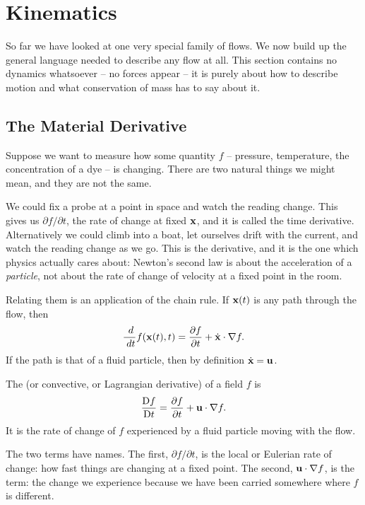 \documentclass[a4paper]{scrartcl}
\newcommand{\D}{\mathrm{D}}
\newcommand{\Dt}[1]{\frac{\D #1}{\D t}}
\newcommand{\pd}[2]{\frac{\partial #1}{\partial #2}}
\begin{document}
\section{Kinematics} \label{sec:kinematics}

So far we have looked at one very special family of flows. We now build up the general language needed to describe any flow at all. This section contains no dynamics whatsoever -- no forces appear -- it is purely about how to describe motion and what conservation of mass has to say about it.

\subsection{The Material Derivative}

Suppose we want to measure how some quantity $f$ -- pressure, temperature, the concentration of a dye -- is changing. There are two natural things we might mean, and they are not the same.

We could fix a probe at a point in space and watch the reading change. This gives us $\partial f /\partial t$, the rate of change at fixed $\mathbf{x}$, and it is called the  time derivative. Alternatively we could climb into a boat, let ourselves drift with the current, and watch the reading change as we go. This is the  derivative, and it is the one which physics actually cares about: Newton's second law is about the acceleration of a \emph{particle}, not about the rate of change of velocity at a fixed point in the room.

Relating them is an application of the chain rule. If $\mathbf{x}(t)$ is any path through the flow, then
$$
\frac{\dd}{\dd t} f(\vv x(t), t) = \pd{f}{t} + \dot{\vv x}\cdot \nabla f.
$$
If the path is that of a fluid particle, then by definition $\dot{\mathbf{x}} = \mathbf{u}$.

\begin{definition}
	The  (or convective, or Lagrangian derivative) of a field $f$ is
	$$
	\Dt{f} = \pd{f}{t} + \vv u \cdot \nabla f.
	$$
	It is the rate of change of $f$ experienced by a fluid particle moving with the flow.
\end{definition}

The two terms have names. The first, $\partial f/\partial t$, is the local or Eulerian rate of change: how fast things are changing at a fixed point. The second, $\mathbf{u} \cdot \nabla f$, is the  term: the change we experience because we have been carried somewhere where $f$ is different.
\end{document}
